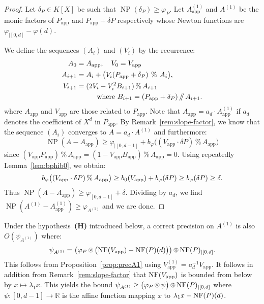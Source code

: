 \documentclass{sig-alternate-2013}
\DeclareMathOperator{\NP}{NP}
\newcommand{\R}{\mathbb R}
\newcommand{\NF}{\text{\rm NF}}
\renewcommand{\mod}{\,\%\,}
\renewcommand{\div}{\,/\hspace{-0.3em}/\,}
\newcommand{\nfop}[1]{%
\raisebox{-0.1mm}{\begin{tikzpicture}
\draw[transparent] (-0.18,0)--(0.18,0);
\draw[very thin] (0,0) circle (0.11cm);
\begin{scope}
\clip (0,0) circle (0.11cm);
\node[scale=0.75] at (0,0) { $#1$ };
\end{scope}
\end{tikzpicture}}}
\newcommand{\nftimes}{\nfop\times}
\newcommand{\nfmod}{\nfop\mod}
\newcommand{\app}{\textrm{app}}
\begin{document}
\begin{proof}
Let $\delta_P \in K[X]$ be such that $\NP(\delta_P) \geq \varphi_P$.
Let $A_\app^{(1)}$ and $A^{(1)}$ be the monic factors of $P_\app$
and $P_\app + \delta P$ respectively whose Newton functions are
$\varphi_{|[0,d]} - \varphi(d)$.

We define the sequences $(A_i)$ and $(V_i)$ by the recurrence: 
\begin{align*} 
A_0 & = A_\app, \quad V_{0} = V_\app \medskip \\ A_{i+1} 
&= A_i + \big(V_i (P_\app + \delta_P) \:\mod\: A_i\big), \smallskip \\ 
V_{i+1} &= (2 V_i -V_i^2 B_{i+1} ) \mod A_{i+1} \\ 
&  \hspace{1cm}\text{where } B_{i+1} = (P_\app + \delta_P) \div A_{i+1}. 
\end{align*} 
where $A_\app$ and $V_\app$ are those related to $P_\app$. Note that 
$A_\app = a_d \cdot A^{(1)}_\app$ if $a_d$ denotes the coefficient of 
$X^d$ in $P_\app$. By Remark~\ref{rem:slope-factor}, we know that the 
sequence $(A_i)$ converges to $A = a_d \cdot A^{(1)}$ and furthermore:
$$\NP(A - A_\app) \geq \varphi_{|[0,d{-}1]} + 
b_\varphi\big((V_\app \cdot \delta P) \mod A_\app\big)$$ 
since $(V_\app P_\app) \mod A_\app = (1 - V_\app B_\app) \mod A_\app = 
0$. Using repeatedly Lemma~\ref{lem:bphib0}, we obtain:
$$b_\varphi\big((V_\app \cdot \delta P) \mod A_\app\big)
  \geq b_0(V_\app) + b_\varphi(\delta P) \\
  \geq b_\varphi(\delta P) \geq \delta.$$
Thus $\NP(A - A_\app) \geq \varphi_{[0,d{-}1]} + \delta$. Dividing
by $a_d$, we find
$\NP(A^{(1)} - A^{(1)}_\app) \geq \varphi_{A^{(1)}}$ and we are done.
\end{proof}

\begin{rem}
Under the hypothesis~\textbf{(H)} introduced below, a correct precision 
on $A^{(1)}$ is also $O(\psi_{A^{(1)}})$ where:
$$\psi_{A^{(1)}} = \big(\varphi_P \nftimes \big(\NF(V_\app)
- \NF(P)(d)\big)\big) \nfmod \NF(P)_{|[0,d]}.$$
This follows from Proposition~\ref{prop:precA1} using
$V^{(1)}_\app = a_d^{-1} V_\app$. It follows in addition from 
Remark~\ref{rem:slope-factor} that $\NF(V_\app)$ is bounded from below 
by $x \mapsto \lambda_1 x$. This yields the bound
$\psi_{A^{(1)}} \geq \big(\varphi_P \nftimes \psi\big) \nfmod 
\NF(P)_{|[0,d]}$
where $\psi : [0,d{-}1] \to \R$ is the affine function mapping $x$
to $\lambda_1 x - \NF(P)(d)$. 
\end{rem}
\end{document}
